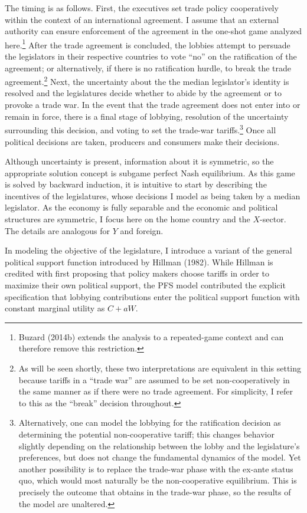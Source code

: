 \documentclass[10pt]{article}
\begin{document}
The timing is as follows. First, the executives set trade policy cooperatively within the context of an international agreement. I assume that an external authority can ensure enforcement of the agreement in the one-shot game analyzed here.\footnote{Buzard (2014b) extends the analysis to a repeated-game context and can therefore remove this restriction.} After the trade agreement is concluded, the lobbies attempt to persuade the legislators in their respective countries to vote ``no'' on the ratification of the agreement; or alternatively, if there is no ratification hurdle, to break the trade agreement.\footnote{As will be seen shortly, these two interpretations are equivalent in this setting because tariffs in a ``trade war'' are assumed to be set non-cooperatively in the same manner as if there were no trade agreement. For simplicity, I refer to this as the ``break'' decision throughout.} Next, the uncertainty about the the median legislator's identity is resolved and the legislatures decide whether to abide by the agreement or to provoke a trade war. In the event that the trade agreement does not enter into or remain in force, there is a final stage of lobbying, resolution of the uncertainty surrounding this decision, and voting to set the trade-war tariffs.\footnote{Alternatively, one can model the lobbying for the ratification decision as determining the potential non-cooperative tariff; this changes behavior slightly depending on the relationship between the lobby and the legislature's preferences, but does not change the fundamental dynamics of the model. Yet another possibility is to replace the trade-war phase with the ex-ante status quo, which would most naturally be the non-cooperative equilibrium. This is precisely the outcome that obtains in the trade-war phase, so the results of the model are unaltered.} Once all political decisions are taken, producers and consumers make their decisions.

Although uncertainty is present, information about it is symmetric, so the appropriate solution concept is subgame perfect Nash equilibrium. As this game is solved by backward induction, it is intuitive to start by describing the incentives of the legislatures, whose decisions I model as being taken by a median legislator. As the economy is fully separable and the economic and political structures are symmetric, I focus here on the home country and the $X$-sector. The details are analogous for $Y$ and foreign.

In modeling the objective of the legislature, I introduce a variant of the general political support function introduced by Hillman (1982). While Hillman is credited with first proposing that policy makers choose tariffs in order to maximize their own political support, the PFS model contributed the explicit specification that lobbying contributions enter the political support function with constant marginal utility as $C + aW$.
\end{document}
